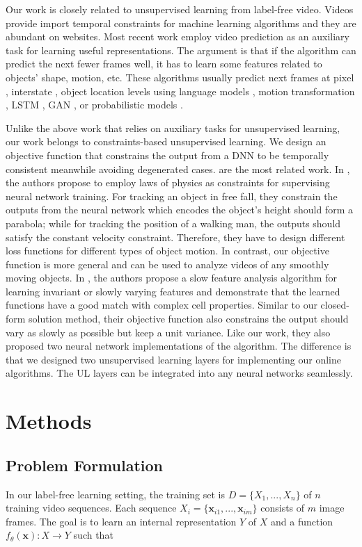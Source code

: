 \documentclass{article}
\begin{document}
Our work is closely related to unsupervised learning from 
label-free video. Videos provide import temporal constraints for machine 
learning algorithms and they are abundant on websites. Most recent work employ 
video prediction as an auxiliary task for learning useful representations. The 
argument is that if the algorithm can predict the next fewer frames well, it 
has to learn some features related to objects' shape, motion, etc. These 
algorithms usually predict next frames at pixel \cite{Srivastava15}, 
interstate \cite{Vondrick15}, object location \cite{Stewart17} levels using 
language models \cite{Ranzato14}, motion transformation \cite{Finn16}, LSTM 
\cite{Srivastava15}, GAN \cite{Mathieu16}, or probabilistic models 
\cite{Xue16}.

Unlike the above work that relies on auxiliary tasks for unsupervised learning,
our work belongs to constraints-based unsupervised learning. We design an 
objective function that constrains the output from a DNN to be temporally 
consistent meanwhile avoiding degenerated cases. \cite{Stewart17, Wiskott02, 
Berkes05} are the most related work. In \cite{Stewart17}, the authors propose 
to employ laws of physics as constraints for supervising neural network 
training. For tracking an object in free fall, they constrain the outputs from 
the neural network which encodes the object's height should form a parabola;
while for tracking the position of a walking man, the outputs should satisfy 
the constant velocity constraint. Therefore, they have to design different loss functions for different types of object motion. In contrast, our objective function is more general and can be used to analyze videos of any smoothly moving 
objects. In \cite{Wiskott02}, the authors propose a slow feature analysis 
algorithm for learning invariant or slowly varying features and demonstrate
that the learned functions have a good match with complex cell properties. Similar to our closed-form solution method, their objective function also constrains the output should vary as slowly as possible but keep a unit variance. Like our
 work, they also proposed two neural network implementations of the algorithm.
The difference is that we designed two unsupervised learning layers for implementing our online algorithms. The UL layers can be integrated into any neural networks seamlessly.

\section{Methods}
\subsection{Problem Formulation}
In our label-free learning setting, the training set is $D=\{X_1, ..., X_n\}$ of
$n$ training video sequences. Each sequence $X_i=\{\mathbf{x}_{i1}, ..., \mathbf{x}_{im}\}$
consists of $m$ image frames. The goal is to learn an internal representation 
$Y$ of $X$ and a function $f_{\theta}(\mathbf{x}): 
X \rightarrow Y$ such that
\end{document}
